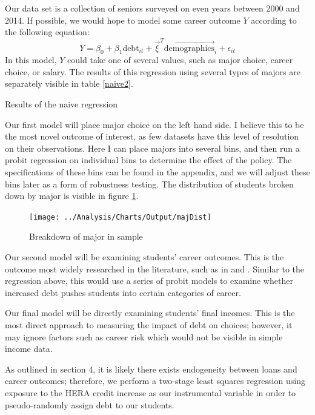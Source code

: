 \documentclass[12pt]{article}
\newcommand{\regs}{../Analysis/Regressions/Output/}
\begin{document}
	Our data set is a collection of seniors surveyed on even years between 2000 and 2014. If possible, we would hope to model some career outcome $Y$ according to the following equation: 
	\begin{equation}
	Y = \beta_0 + \beta_1 \mbox{debt}_{it} + \vec{\xi}^T \vec{\mbox{demographics}}_i + \epsilon_{it} \label{naiveeq}
	\end{equation} 
	In this model, $Y$ could take one of several values, such as major choice, career choice, or salary. The results of this regression using several types of majors are separately visible in table \ref{naive2}. 
	
	\begin{table}
		\centering
		\caption{Results of the naive regression}
		
		\label{naive2}
	\end{table}
	
	Our first model will place major choice on the left hand side. I believe this to be the most novel outcome of interest, as few datasets have this level of resolution on their observations. Here I can place majors into several bins, and then run a probit regression on individual bins to determine the effect of the policy. The specifications of these bins can be found in the appendix, and we will adjust these bins later as a form of robustness  testing. The distribution of students broken down by major is visible in figure \ref{majDist}.

	\begin{figure}
		\centering
		\caption{Breakdown of major in sample}
		\texttt{[image: ../Analysis/Charts/Output/majDist]}
		\label{majDist}
	\end{figure}
	
	Our second model will be examining students' career outcomes. This is the outcome most widely researched in the literature, such as in \textcite{rothstein2011} and \textcite{field2009}. Similar to the regression above, this would use a series of probit models to examine whether increased debt pushes students into certain categories of career.
	
	Our final model will be directly examining students' final incomes. This is the most direct approach to measuring the impact of debt on choices; however, it may ignore factors such as career risk which would not be visible in simple income data.
	
	As outlined in section 4, it is likely there exists endogeneity between loans and career outcomes; therefore, we perform a two-stage least squares regression using exposure to the HERA credit increase as our instrumental variable in order to pseudo-randomly assign debt to our students. 
	
\end{document}
